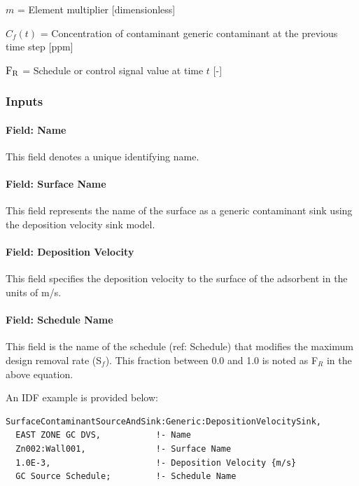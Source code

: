\(m\) = Element multiplier {[}dimensionless{]}

\(C_f (t)\) = Concentration of contaminant generic contaminant at the previous time step {[}ppm{]}

\(\rm{F}_{R}\) = Schedule or control signal value at time \(t\) {[}-{]}

\subsubsection{Inputs}\label{inputs-16-005}

\paragraph{Field: Name}\label{field-name-16-004}

This field denotes a unique identifying name.

\paragraph{Field: Surface Name}\label{field-surface-name-4-000}

This field represents the name of the surface as a generic contaminant sink using the deposition velocity sink model.

\paragraph{Field: Deposition Velocity}\label{field-deposition-velocity}

This field specifies the deposition velocity to the surface of the adsorbent in the units of m/s.

\paragraph{Field: Schedule Name}\label{field-schedule-name-9}

This field is the name of the schedule (ref: Schedule) that modifies the maximum design removal rate (S\(_{f}\)). This fraction between 0.0 and 1.0 is noted as F\(_{R}\) in the above equation.

An IDF example is provided below:

\begin{lstlisting}
SurfaceContaminantSourceAndSink:Generic:DepositionVelocitySink,
  EAST ZONE GC DVS,           !- Name
  Zn002:Wall001,              !- Surface Name
  1.0E-3,                     !- Deposition Velocity {m/s}
  GC Source Schedule;         !- Schedule Name
\end{lstlisting}

